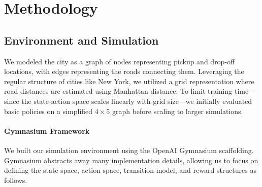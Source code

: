 \documentclass[11pt]{article}
\begin{document}
\section{Methodology}



\subsection{Environment and Simulation}
\label{sec:env}

We modeled the city as a graph of nodes representing pickup and drop-off locations, with edges representing
the roads connecting them. Leveraging the regular structure of cities like New York, we utilized a grid
representation where road distances are estimated using Manhattan distance. To limit training time—since the
state-action space scales linearly with grid size—we initially evaluated basic policies on a simplified $4
\times 5$ graph before scaling to larger simulations.

\paragraph{Gymnasium Framework}
We built our simulation environment using the OpenAI Gymnasium scaffolding. Gymnasium abstracts away
many implementation details, allowing us to focus on defining the state space, action space, transition
model, and reward structures as follows.
\end{document}
